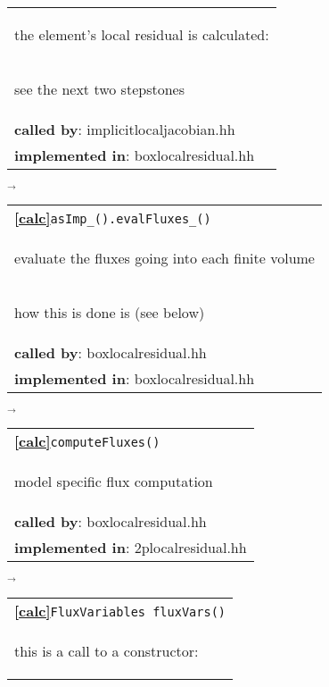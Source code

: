 \begin{landscape}
{\begin{tabular}{|l|}
    \begin{scriptsize}the element's local residual is calculated:\end{scriptsize}\\
    \begin{scriptsize}see the next two stepstones\end{scriptsize}\\
      \textbf{called by}: implicitlocaljacobian.hh\\
      \textbf{implemented in}: boxlocalresidual.hh\\  
     \hline
  \end{tabular}
    $\overrightarrow{
    }$
    \begin{tabular}{|l|}
      \hline
    \textbf{\textcircled{\ref{calc}}}\verb+asImp_().evalFluxes_()+ \\
    \begin{scriptsize}evaluate the fluxes going into each finite volume\end{scriptsize}\\
    \begin{scriptsize}how this is done is \fbox{\fbox{model specific}} (see below)\end{scriptsize}\\
      \textbf{called by}: boxlocalresidual.hh\\
      \textbf{implemented in}: boxlocalresidual.hh\\  
     \hline
  \end{tabular}
\nextline
{$\overrightarrow{}$}
     \begin{tabular}{||l||}
        \hline\hline
        \textbf{\textcircled{\ref{calc}}}\verb+computeFluxes()+ \\
        \begin{scriptsize}model specific flux computation  \end{scriptsize}\\
        \textbf{called by}: boxlocalresidual.hh\\
        \textbf{implemented in}: 2plocalresidual.hh\\  
        \hline\hline
     \end{tabular}
    $\overrightarrow{
    }$
     \begin{tabular}{||l||}
        \hline\hline
        \textbf{\textcircled{\ref{calc}}}\verb+FluxVariables fluxVars()+ \\
        \begin{scriptsize}this is a call to a constructor:  \end{scriptsize}\\

\end{tabular}}
\end{landscape}
